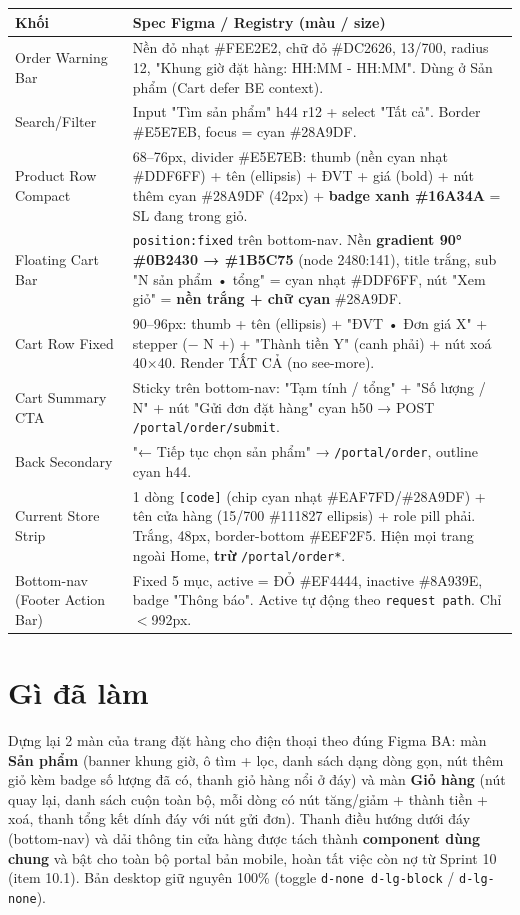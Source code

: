 \begin{longtable}{@{}lp{8.6cm}@{}}
\toprule
\textbf{Khối} & \textbf{Spec Figma / Registry (màu / size)} \\
\midrule
\endhead
Order Warning Bar & Nền đỏ nhạt \#FEE2E2, chữ đỏ \#DC2626, 13/700, radius 12,
"Khung giờ đặt hàng: HH:MM - HH:MM". Dùng ở Sản phẩm (Cart defer BE context). \\
Search/Filter & Input "Tìm sản phẩm" h44 r12 + select "Tất cả". Border \#E5E7EB,
focus = cyan \#28A9DF. \\
Product Row Compact & 68--76px, divider \#E5E7EB: thumb (nền cyan nhạt \#DDF6FF) +
tên (ellipsis) + ĐVT + giá (bold) + nút thêm cyan \#28A9DF (42px) + \textbf{badge
xanh \#16A34A} = SL đang trong giỏ. \\
Floating Cart Bar & \texttt{position:fixed} trên bottom-nav. Nền \textbf{gradient
90° \#0B2430 → \#1B5C75} (node 2480:141), title trắng, sub "N sản phẩm • tổng" =
cyan nhạt \#DDF6FF, nút "Xem giỏ" = \textbf{nền trắng + chữ cyan} \#28A9DF. \\
Cart Row Fixed & 90--96px: thumb + tên (ellipsis) + "ĐVT • Đơn giá X" + stepper
(− N +) + "Thành tiền Y" (canh phải) + nút xoá 40×40. Render TẤT CẢ (no see-more). \\
Cart Summary CTA & Sticky trên bottom-nav: "Tạm tính / tổng" + "Số lượng / N" +
nút "Gửi đơn đặt hàng" cyan h50 → POST \texttt{/portal/order/submit}. \\
Back Secondary & "← Tiếp tục chọn sản phẩm" → \texttt{/portal/order}, outline cyan h44. \\
Current Store Strip & 1 dòng \texttt{[code]} (chip cyan nhạt \#EAF7FD/\#28A9DF) +
tên cửa hàng (15/700 \#111827 ellipsis) + role pill phải. Trắng, 48px, border-bottom
\#EEF2F5. Hiện mọi trang ngoài Home, \textbf{trừ} \texttt{/portal/order*}. \\
Bottom-nav (Footer Action Bar) & Fixed 5 mục, active = ĐỎ \#EF4444, inactive
\#8A939E, badge "Thông báo". Active tự động theo \texttt{request path}. Chỉ \(<\)992px. \\
\bottomrule
\end{longtable}

\section{Gì đã làm}

Dựng lại 2 màn của trang đặt hàng cho điện thoại theo đúng Figma BA: màn
\textbf{Sản phẩm} (banner khung giờ, ô tìm + lọc, danh sách dạng dòng gọn, nút
thêm giỏ kèm badge số lượng đã có, thanh giỏ hàng nổi ở đáy) và màn \textbf{Giỏ
hàng} (nút quay lại, danh sách cuộn toàn bộ, mỗi dòng có nút tăng/giảm + thành
tiền + xoá, thanh tổng kết dính đáy với nút gửi đơn). Thanh điều hướng dưới đáy
(bottom-nav) và dải thông tin cửa hàng được tách thành \textbf{component dùng
chung} và bật cho toàn bộ portal bản mobile, hoàn tất việc còn nợ từ Sprint 10
(item 10.1). Bản desktop giữ nguyên 100\% (toggle \texttt{d-none d-lg-block} /
\texttt{d-lg-none}).

